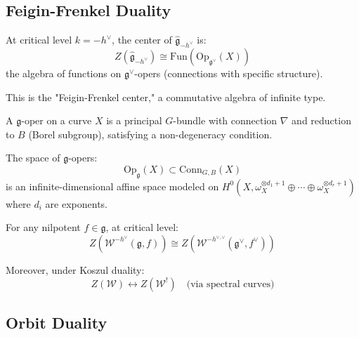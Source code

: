 \subsection{Feigin-Frenkel Duality}

\begin{theorem}\label{thm:feigin-frenkel-center}
At critical level $k = -h^\vee$, the center of $\widehat{\mathfrak{g}}_{-h^\vee}$ is:
\begin{equation}
Z(\widehat{\mathfrak{g}}_{-h^\vee}) \cong \mathrm{Fun}(\mathrm{Op}_{\mathfrak{g}^\vee}(X))
\end{equation}
the algebra of functions on $\mathfrak{g}^\vee$-opers (connections with specific structure).

This is the "Feigin-Frenkel center," a commutative algebra of infinite type.
\end{theorem}

\begin{definition}[Opers]
A $\mathfrak{g}$-oper on a curve $X$ is a principal $G$-bundle with connection $\nabla$ and reduction to $B$ (Borel subgroup), satisfying a non-degeneracy condition.

The space of $\mathfrak{g}$-opers:
\begin{equation}
\mathrm{Op}_{\mathfrak{g}}(X) \subset \mathrm{Conn}_{G,B}(X)
\end{equation}
is an infinite-dimensional affine space modeled on $H^0(X, \omega_X^{\otimes d_1+1} \oplus \cdots \oplus \omega_X^{\otimes d_r+1})$ where $d_i$ are exponents.
\end{definition}

\begin{theorem}\label{thm:w-center-langlands}
For any nilpotent $f \in \mathfrak{g}$, at critical level:
\begin{equation}
Z(\mathcal{W}^{-h^\vee}(\mathfrak{g}, f)) \cong Z(\mathcal{W}^{-h^{\vee,\vee}}(\mathfrak{g}^\vee, f^\vee))
\end{equation}

Moreover, under Koszul duality:
\begin{equation}
Z(\mathcal{W}) \longleftrightarrow Z(\mathcal{W}^!) \quad \text{(via spectral curves)}
\end{equation}
\end{theorem}

\subsection{Orbit Duality}

